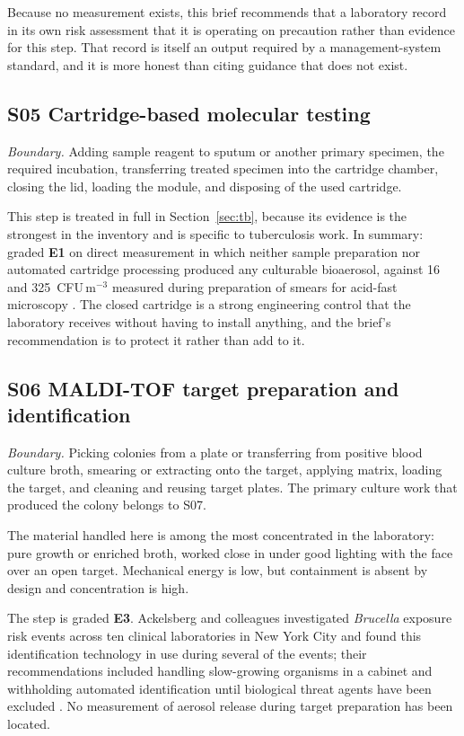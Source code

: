 Because no measurement exists, this brief recommends that a laboratory record
in its own risk assessment that it is operating on precaution rather than
evidence for this step. That record is itself an output required by a
management-system standard, and it is more honest than citing guidance that
does not exist.

\subsection{S05 Cartridge-based molecular testing}

\textit{Boundary.} Adding sample reagent to sputum or another primary specimen,
the required incubation, transferring treated specimen into the cartridge
chamber, closing the lid, loading the module, and disposing of the used
cartridge.

This step is treated in full in Section~\ref{sec:tb}, because its evidence is
the strongest in the inventory and is specific to tuberculosis work. In summary:
graded \textbf{E1} on direct measurement in which neither sample preparation
nor automated cartridge processing produced any culturable bioaerosol, against
16 and 325~CFU\,m$^{-3}$ measured during preparation of smears for acid-fast
microscopy \cite{banada2010}. The closed cartridge is a strong engineering
control that the laboratory receives without having to install anything, and
the brief's recommendation is to protect it rather than add to it.

\subsection{S06 MALDI-TOF target preparation and identification}

\textit{Boundary.} Picking colonies from a plate or transferring from positive
blood culture broth, smearing or extracting onto the target, applying matrix,
loading the target, and cleaning and reusing target plates. The primary culture
work that produced the colony belongs to S07.

The material handled here is among the most concentrated in the laboratory:
pure growth or enriched broth, worked close in under good lighting with the
face over an open target. Mechanical energy is low, but containment is absent
by design and concentration is high.

The step is graded \textbf{E3}. Ackelsberg and colleagues investigated
\textit{Brucella} exposure risk events across ten clinical laboratories in New
York City and found this identification technology in use during several of the
events; their recommendations included handling slow-growing organisms in a
cabinet and withholding automated identification until biological threat agents
have been excluded \cite{ackelsberg2020}. No measurement of aerosol release
during target preparation has been located.

